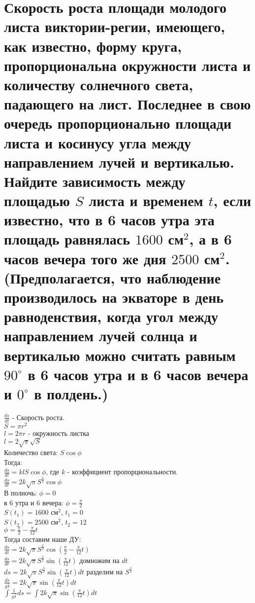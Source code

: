 \documentclass{article}
\begin{document}
    \section{Скорость роста площади молодого листа виктории-регии, имеющего, как известно, форму круга,
пропорциональна окружности листа и количеству солнечного света, падающего на лист. Последнее
в свою очередь пропорционально площади листа и косинусу угла между направлением лучей и вертикалью. Найдите зависимость между площадью $S$ листа и временем $t$, если известно, что в 6 часов
утра эта площадь равнялась $1600$ см$^2$, а в 6 часов вечера того же дня $2500$ см$^2$. (Предполагается, что
наблюдение производилось на экваторе в день равноденствия, когда угол между направлением лучей
солнца и вертикалью можно считать равным $90^{\circ}$ в 6 часов утра и в 6 часов вечера и $0^{\circ}$ в полдень.)}
    $\frac{ds}{dt} $ - Скорость роста. \\
    $S = \pi r^2 $ \\
    $l = 2\pi r$ - окружность листка \\
    $l = 2\sqrt{\pi}\sqrt{S}$  \\
    Количество света: $S  \cos{\phi}$ \\
    Тогда: \\
    $\frac{ds}{dt} = k  l  S  \cos{\phi}$, где $k$ - коэффициент пропорциональности. \\
    $\frac{ds}{dt} = 2k \sqrt{\pi}  S^{\frac{3}{2}} \cos{\phi}$ \\
    В полночь: $\phi = 0$\\
    в 6 утра и 6 вечера: $\phi = \frac{\pi}{2}$\\
    $S(t_1) = 1600$ см$^2$, $t_1 = 0$\\
    $S(t_2) = 2500$ см$^2$, $t_2 = 12$\\
    $\phi = \frac{\pi}{2} - \frac{\pi}{12}  t $\\
    Тогда составим наше ДУ:\\
    $\frac{ds}{dt} = 2  k\sqrt{\pi}  S^{\frac{3}{2}}  \cos{(\frac{\pi}{2} - \frac{\pi}{12}  t)}$\\
    $\frac{ds}{dt} = 2  k\sqrt{\pi}  S^{\frac{3}{2}}  \sin{(\frac{\pi}{12}  t)}$  домножим на $dt$ \\
    $ds = 2  k\sqrt{\pi}  S^{\frac{3}{2}}  \sin{(\frac{\pi}{12}  t)}  dt$ разделим на $S^{\frac{3}{2}}$\\
    $\frac{ds}{S^{\frac{3}{2}}} = 2  k\sqrt{\pi}  \sin{(\frac{\pi}{12}  t)}  dt$ \\
    $\int \frac{1}{S^{\frac{3}{2}}}  ds = \int 2  k  \sqrt{\pi}  \sin{(\frac{\pi}{12} t)}  dt$ \\
\end{document}
